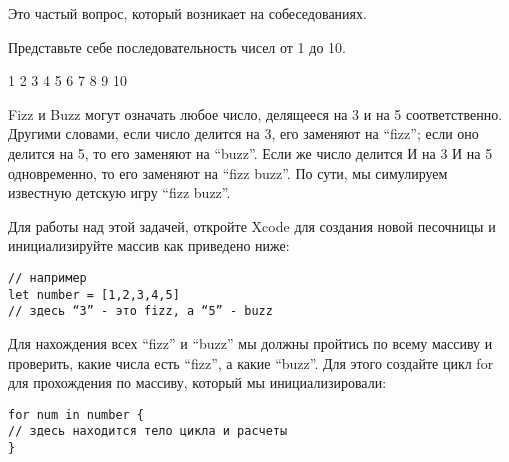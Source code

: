 \vspace{\baselineskip}

Это частый вопрос, который возникает на собеседованиях.

\vspace{\baselineskip}

Представьте себе последовательность чисел от 1 до 10.

\vspace{\baselineskip}

\begin{tcolorbox} 
1 2 3 4 5 6 7 8 9 10
\end{tcolorbox}

\vspace{\baselineskip}

Fizz и Buzz могут означать любое число, делящееся на 3 и на 5 соответственно. Другими словами, если число делится на 3, его заменяют на “fizz”; если оно делится на 5, то его заменяют на “buzz”. Если же число делится И на 3 И на 5 одновременно, то его заменяют на “fizz buzz”. По сути, мы симулируем известную детскую игру “fizz buzz”.

\vspace{\baselineskip}

Для работы над этой задачей, откройте Xcode для создания новой песочницы и инициализируйте массив как приведено ниже:

\vspace{\baselineskip}

\begin{tcolorbox} 
\begin{verbatim}
// например
let number = [1,2,3,4,5]
// здесь “3” - это fizz, а “5” - buzz
\end{verbatim}
\end{tcolorbox}

\vspace{\baselineskip}

Для нахождения всех “fizz” и “buzz” мы должны пройтись по всему массиву и проверить, какие числа есть “fizz”, а какие “buzz”. Для этого создайте цикл for для прохождения по массиву, который мы инициализировали:

\vspace{\baselineskip}

\begin{tcolorbox} 
\begin{verbatim}
for num in number {
// здесь находится тело цикла и расчеты
}
\end{verbatim}
\end{tcolorbox}

